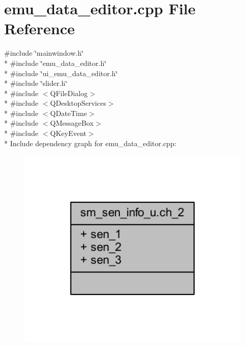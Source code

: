\hypertarget{a00093}{\section{emu\+\_\+data\+\_\+editor.\+cpp File Reference}
\label{a00093}
}
{\ttfamily \#include \char`\"{}mainwindow.\+h\char`\"{}}\\*
{\ttfamily \#include \char`\"{}emu\+\_\+data\+\_\+editor.\+h\char`\"{}}\\*
{\ttfamily \#include \char`\"{}ui\+\_\+emu\+\_\+data\+\_\+editor.\+h\char`\"{}}\\*
{\ttfamily \#include \char`\"{}slider.\+h\char`\"{}}\\*
{\ttfamily \#include $<$Q\+File\+Dialog$>$}\\*
{\ttfamily \#include $<$Q\+Desktop\+Services$>$}\\*
{\ttfamily \#include $<$Q\+Date\+Time$>$}\\*
{\ttfamily \#include $<$Q\+Message\+Box$>$}\\*
{\ttfamily \#include $<$Q\+Key\+Event$>$}\\*
Include dependency graph for emu\+\_\+data\+\_\+editor.\+cpp\+:
\nopagebreak
\begin{figure}[H]
\begin{center}
\leavevmode
\includegraphics[width=350pt]{d0/d3e/a00253}
\end{center}
\end{figure}
